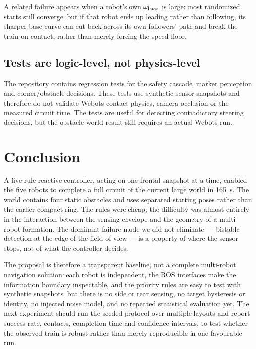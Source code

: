 \documentclass[conference,a4paper]{IEEEtran}
\begin{document}
A related failure appears when a robot's own $\omega_{\rm base}$ is large:
most randomized starts still converge, but if that robot ends up leading
rather than following, its sharper base curve can cut back across its own
followers' path and break the train on contact, rather than merely forcing
the speed floor.

\subsection{Tests are logic-level, not physics-level}
The repository contains regression tests for the safety cascade, marker
perception and corner/obstacle decisions. These tests use synthetic sensor
snapshots and therefore do not validate Webots contact physics, camera
occlusion or the measured circuit time. The tests are useful for detecting
contradictory steering decisions, but the obstacle-world result still requires
an actual Webots run.

\section{Conclusion}
A five-rule reactive controller, acting on one frontal snapshot at a time,
enabled the five robots to complete a full circuit of the current large world
in \SI{165}{\second}. The world contains four static obstacles and uses
separated starting poses rather than the earlier compact ring. The rules were
cheap; the difficulty was almost entirely in the interaction between the
sensing envelope and the geometry of a multi-robot formation. The dominant
failure mode we did not eliminate --- bistable detection at the edge of the
field of view --- is a property of where the sensor stops, not of what the
controller decides.

The proposal is therefore a transparent baseline, not a complete multi-robot
navigation solution: each robot is independent, the ROS interfaces make the
information boundary inspectable, and the priority rules are easy to test
with synthetic snapshots, but there is no side or rear sensing, no target
hysteresis or identity, no injected noise model, and no repeated statistical
evaluation yet. The next experiment should run the seeded protocol over
multiple layouts and report success rate, contacts, completion time and
confidence intervals, to test whether the observed train is robust rather
than merely reproducible in one favourable run.
\end{document}
